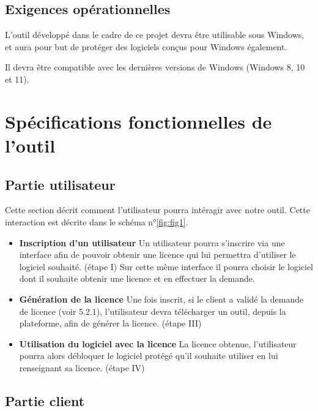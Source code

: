 \section{Exigences opérationnelles}

L'outil développé dans le cadre de ce projet devra être utilisable sous Windows, et aura pour but de protéger des logiciels conçus pour Windows également.

Il devra être compatible avec les dernières versions de Windows (Windows 8, 10 et 11).

\chapter{Spécifications fonctionnelles de l'outil}

\section{Partie utilisateur}

Cette section décrit comment l'utilisateur pourra intéragir avec notre outil. Cette interaction est décrite dans le schéma n°\ref{fig:fig1}.
\newline

\begin{itemize}
	\item \textbf{Inscription d'un utilisateur} \newline
	Un utilisateur pourra s'inscrire via une interface afin de pouvoir obtenir une licence qui lui permettra d'utiliser le logiciel souhaité. (étape I)
	Sur cette même interface il pourra choisir le logiciel dont il souhaite obtenir une licence et en effectuer la demande.
	\item \textbf{Génération de la licence} \newline
	Une fois inscrit, si le client a validé la demande de licence (voir 5.2.1), l'utilisateur devra télécharger un outil, depuis la plateforme, afin de générer la licence. (étape III)
	\item \textbf{Utilisation du logiciel avec la licence} \newline
	La licence obtenue, l'utilisateur pourra alors débloquer le logiciel protégé qu'il souhaite utiliser en lui renseignant sa licence. (étape IV)
\end{itemize}

\section{Partie client}

